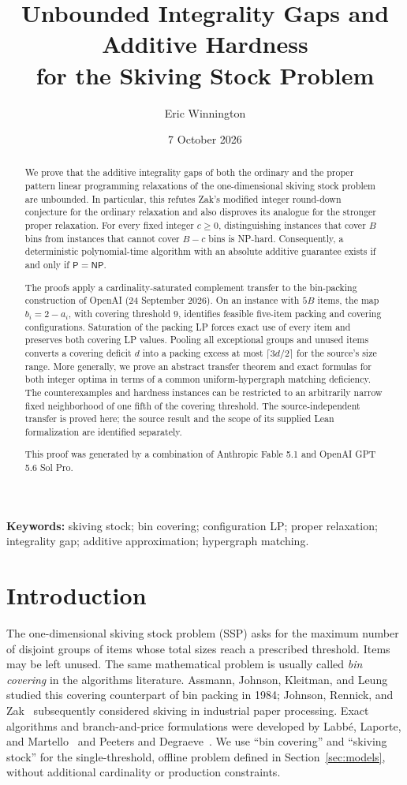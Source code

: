 \documentclass[11pt,a4paper]{article}
\title{\bfseries Unbounded Integrality Gaps and Additive Hardness\\[3pt] for the Skiving Stock Problem}
\author{Eric Winnington}
\date{7 October 2026}
\theoremstyle{definition}
\theoremstyle{remark}
\newcommand{\Pclass}{\mathsf P}
\newcommand{\NPclass}{\mathsf{NP}}
\begin{document}
\maketitle
\thispagestyle{plain}
\begin{abstract}
We prove that the additive integrality gaps of both the ordinary and the proper pattern linear programming relaxations of the one-dimensional skiving stock problem are unbounded. In particular, this refutes Zak's modified integer round-down conjecture for the ordinary relaxation and also disproves its analogue for the stronger proper relaxation. For every fixed integer $c\ge0$, distinguishing instances that cover $B$ bins from instances that cannot cover $B-c$ bins is NP-hard. Consequently, a deterministic polynomial-time algorithm with an absolute additive guarantee exists if and only if $\Pclass=\NPclass$.

The proofs apply a cardinality-saturated complement transfer to the bin-packing construction of OpenAI (24 September 2026). On an instance with $5B$ items, the map $b_i=2-a_i$, with covering threshold $9$, identifies feasible five-item packing and covering configurations. Saturation of the packing LP forces exact use of every item and preserves both covering LP values. Pooling all exceptional groups and unused items converts a covering deficit $d$ into a packing excess at most $\lceil3d/2\rceil$ for the source's size range. More generally, we prove an abstract transfer theorem and exact formulas for both integer optima in terms of a common uniform-hypergraph matching deficiency. The counterexamples and hardness instances can be restricted to an arbitrarily narrow fixed neighborhood of one fifth of the covering threshold. The source-independent transfer is proved here; the source result and the scope of its supplied Lean formalization are identified separately.

This proof was generated by a combination of Anthropic Fable 5.1 and OpenAI GPT 5.6 Sol Pro.
\end{abstract}
\medskip
\noindent\textbf{Keywords:} skiving stock; bin covering; configuration LP; proper relaxation; integrality gap; additive approximation; hypergraph matching.

\section{Introduction}\label{sec:intro}
The one-dimensional skiving stock problem (SSP) asks for the maximum number of disjoint groups of items whose total sizes reach a prescribed threshold. Items may be left unused. The same mathematical problem is usually called \emph{bin covering} in the algorithms literature. Assmann, Johnson, Kleitman, and Leung~\cite{AJKL84} studied this covering counterpart of bin packing in 1984; Johnson, Rennick, and Zak~\cite{JRZ97} subsequently considered skiving in industrial paper processing. Exact algorithms and branch-and-price formulations were developed by Labb\'e, Laporte, and Martello~\cite{LLM95} and Peeters and Degraeve~\cite{PD06}. We use ``bin covering'' and ``skiving stock'' for the single-threshold, offline problem defined in Section~\ref{sec:models}, without additional cardinality or production constraints.
\end{document}

